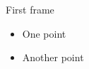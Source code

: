 \documentclass{beamer}
\begin{document}
\begin{frame}{First frame}
  \begin{itemize}
    \item One point
    \item Another point
  \end{itemize}
\end{frame}
\end{document}
